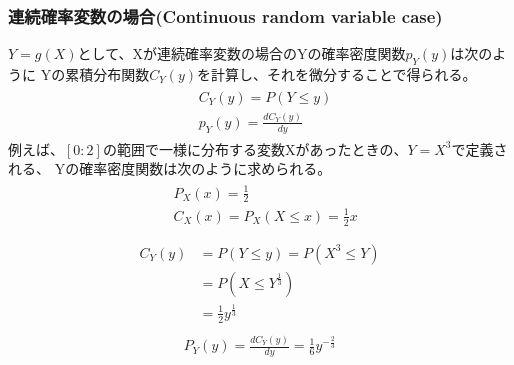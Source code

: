 \documentclass[a4j]{jarticle}
\begin{document}
\subsubsection{連続確率変数の場合(Continuous random variable case)}
$Y=g(X)$として、Xが連続確率変数の場合のYの確率密度関数$p_{Y}(y)$は次のように
Yの累積分布関数$C_{Y}(y)$を計算し、それを微分することで得られる。
\begin{align}
    \begin{aligned}
    &C_{Y}(y)=P(Y \leq y) \\
    &p_{Y}(y)=\frac{dC_{Y}(y)}{dy}
    \end{aligned}
\end{align}
例えば、$[0:2]$の範囲で一様に分布する変数Xがあったときの、$Y=X^3$で定義される、
Yの確率密度関数は次のように求められる。
\begin{align}
    \begin{aligned}
    &P_{X}(x)=\frac{1}{2} \\
    &C_{X}(x)=P_{X}(X \leq x)=\frac{1}{2}x \\
    \end{aligned}
\end{align}
\begin{align}
    \begin{aligned}
    C_{Y}(y)&=P(Y \leq y)=P(X^3 \leq Y) \\
    &=P(X \leq Y^{\frac{1}{3}}) \\
    &=\frac{1}{2}y^{\frac{1}{3}}
    \end{aligned}
\end{align}
\begin{align}
    \begin{aligned}
    P_{Y}(y)=\frac{dC_{Y}(y)}{dy}=\frac{1}{6}y^{-\frac{2}{3}}
    \end{aligned}
\end{align}
\end{document}
